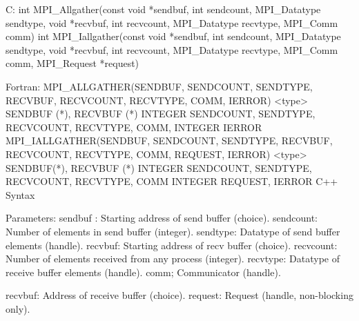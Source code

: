 C:
int MPI_Allgather(const void *sendbuf, int  sendcount,
     MPI_Datatype sendtype, void *recvbuf, int recvcount,
     MPI_Datatype recvtype, MPI_Comm comm)
int MPI_Iallgather(const void *sendbuf, int  sendcount,
     MPI_Datatype sendtype, void *recvbuf, int recvcount,
     MPI_Datatype recvtype, MPI_Comm comm, MPI_Request *request)

Fortran:
MPI_ALLGATHER(SENDBUF, SENDCOUNT, SENDTYPE, RECVBUF, RECVCOUNT,
        RECVTYPE, COMM, IERROR)
    <type>    SENDBUF (*), RECVBUF (*)
    INTEGER    SENDCOUNT, SENDTYPE, RECVCOUNT, RECVTYPE, COMM,
    INTEGER    IERROR
MPI_IALLGATHER(SENDBUF, SENDCOUNT, SENDTYPE, RECVBUF, RECVCOUNT,
        RECVTYPE, COMM, REQUEST, IERROR)
    <type>    SENDBUF(*), RECVBUF (*)
    INTEGER    SENDCOUNT, SENDTYPE, RECVCOUNT, RECVTYPE, COMM
    INTEGER    REQUEST, IERROR
C++ Syntax

Parameters:
sendbuf : Starting address of send buffer (choice).
sendcount: Number of elements in send buffer (integer).
sendtype: Datatype of send buffer elements (handle).
recvbuf: Starting address of recv buffer (choice).
recvcount: Number of elements received from any process (integer).
recvtype: Datatype of receive buffer elements (handle).
comm; Communicator (handle).

recvbuf: Address of receive buffer (choice).
request: Request (handle, non-blocking only).
